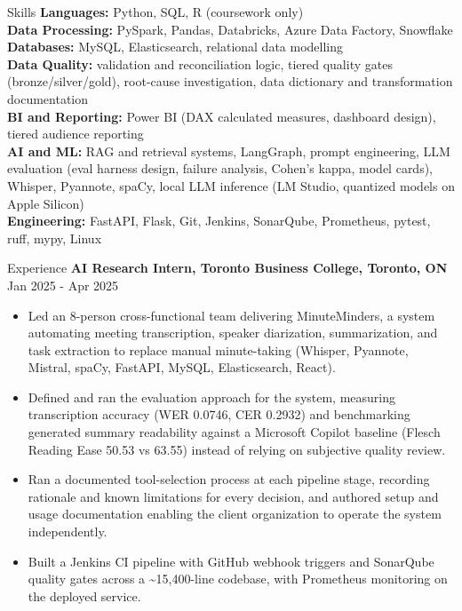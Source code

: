 \documentclass{resume}
\begin{document}
\begin{rSection}{Skills}
\vspace{0.4em}
\textbf{Languages:} Python, SQL, R (coursework only) \\
\textbf{Data Processing:} PySpark, Pandas, Databricks, Azure Data Factory, Snowflake \\
\textbf{Databases:} MySQL, Elasticsearch, relational data modelling \\
\textbf{Data Quality:} validation and reconciliation logic, tiered quality gates (bronze/silver/gold), root-cause investigation, data dictionary and transformation documentation \\
\textbf{BI and Reporting:} Power BI (DAX calculated measures, dashboard design), tiered audience reporting \\
\textbf{AI and ML:} RAG and retrieval systems, LangGraph, prompt engineering, LLM evaluation (eval harness design, failure analysis, Cohen's kappa, model cards), Whisper, Pyannote, spaCy, local LLM inference (LM Studio, quantized models on Apple Silicon) \\
\textbf{Engineering:} FastAPI, Flask, Git, Jenkins, SonarQube, Prometheus, pytest, ruff, mypy, Linux 
\end{rSection}

\begin{rSection}{Experience}
\vspace{0.4em}
\textbf{AI Research Intern, Toronto Business College, Toronto, ON} \hfill Jan 2025 - Apr 2025
\begin{itemize}
    \item Led an 8-person cross-functional team delivering MinuteMinders, a system automating meeting transcription, speaker diarization, summarization, and task extraction to replace manual minute-taking (Whisper, Pyannote, Mistral, spaCy, FastAPI, MySQL, Elasticsearch, React).
    \item Defined and ran the evaluation approach for the system, measuring transcription accuracy (WER 0.0746, CER 0.2932) and benchmarking generated summary readability against a Microsoft Copilot baseline (Flesch Reading Ease 50.53 vs 63.55) instead of relying on subjective quality review.
    \item Ran a documented tool-selection process at each pipeline stage, recording rationale and known limitations for every decision, and authored setup and usage documentation enabling the client organization to operate the system independently.
    \item Built a Jenkins CI pipeline with GitHub webhook triggers and SonarQube quality gates across a \textasciitilde{}15,400-line codebase, with Prometheus monitoring on the deployed service.
\end{itemize}

\end{rSection}
\end{document}
